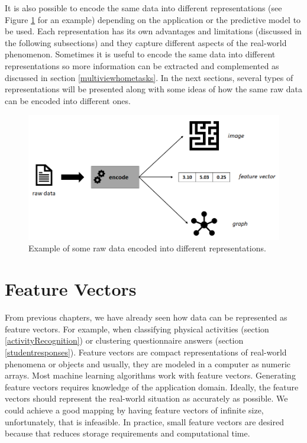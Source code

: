 \documentclass[
  11pt,
]{krantz}
\begin{document}
It is also possible to encode the same data into different representations (see Figure \ref{fig:imgRepepresentations} for an example) depending on the application or the predictive model to be used. Each representation has its own advantages and limitations (discussed in the following subsections) and they capture different aspects of the real-world phenomenon. Sometimes it is useful to encode the same data into different representations so more information can be extracted and complemented as discussed in section \ref{multiviewhometasks}. In the next sections, several types of representations will be presented along with some ideas of how the same raw data can be encoded into different ones.

\begin{figure}

{\centering \includegraphics[width=0.9\linewidth]{images/representations} 

}

\caption{Example of some raw data encoded into different representations.}\label{fig:imgRepepresentations}
\end{figure}

\hypertarget{feature-vectors}{%
\section{Feature Vectors}\label{feature-vectors}}

From previous chapters, we have already seen how data can be represented as feature vectors. For example, when classifying physical activities (section \ref{activityRecognition}) or clustering questionnaire answers (section \ref{studentresponses}). Feature vectors are compact representations of real-world phenomena or objects and usually, they are modeled in a computer as numeric arrays. Most machine learning algorithms work with feature vectors. Generating feature vectors requires knowledge of the application domain. Ideally, the feature vectors should represent the real-world situation as accurately as possible. We could achieve a good mapping by having feature vectors of infinite size, unfortunately, that is infeasible. In practice, small feature vectors are desired because that reduces storage requirements and computational time.
\end{document}
